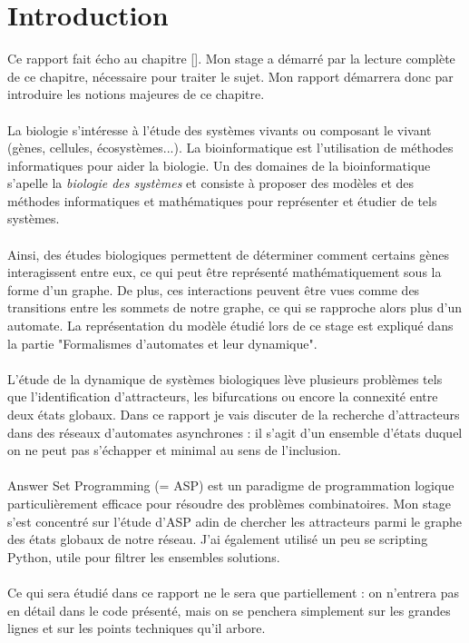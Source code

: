 \documentclass[12pt,a4paper]{article}
\begin{document}
\section{Introduction}
Ce rapport fait écho au chapitre [\cite{chapitre}]. Mon stage a démarré par la lecture complète de ce chapitre, nécessaire pour traiter le sujet.
Mon rapport démarrera donc par introduire les notions majeures de ce chapitre.\\ \\
La biologie s'intéresse à l'étude des systèmes vivants ou composant le vivant (gènes, cellules, écosystèmes...). La bioinformatique est l'utilisation de méthodes informatiques pour aider la biologie. Un des domaines de la 
bioinformatique s'apelle la \emph{biologie des systèmes} et consiste à proposer des modèles et des méthodes informatiques et mathématiques pour représenter et étudier de tels systèmes.\\ \\
Ainsi, des études biologiques permettent de déterminer comment certains gènes interagissent entre eux, ce qui peut être représenté mathématiquement sous la forme d'un graphe. De plus, ces interactions peuvent être vues comme des 
transitions entre les sommets de notre graphe, ce qui se rapproche alors plus d'un automate. La représentation du modèle étudié lors de ce stage est expliqué dans la partie "Formalismes d'automates et leur dynamique".\\ \\
L'étude de la dynamique de systèmes biologiques lève plusieurs problèmes tels que l'identification d'attracteurs, les bifurcations ou encore la connexité entre deux états globaux. Dans ce rapport je vais discuter de la recherche 
d'attracteurs dans des réseaux d'automates asynchrones : il s'agit d'un ensemble d'états duquel on ne peut pas s'échapper et minimal au sens de l'inclusion.\\ \\
Answer Set Programming (= ASP) est un paradigme de programmation logique particulièrement efficace pour résoudre des problèmes combinatoires. Mon stage s'est concentré sur l'étude d'ASP adin de chercher les attracteurs parmi le graphe des états globaux de notre réseau. J'ai également utilisé un peu se scripting Python, utile pour filtrer les ensembles solutions.\\ \\
Ce qui sera étudié dans ce rapport ne le sera que partiellement : on n'entrera pas en détail dans le code présenté, mais on se penchera simplement sur les grandes lignes et sur les points techniques qu'il arbore.
\end{document}
